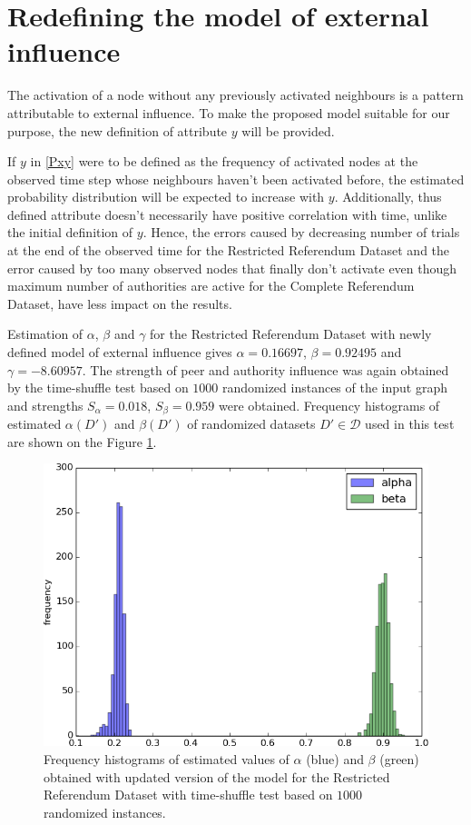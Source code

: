 \documentclass[times, utf8, zavrsni]{fer}
\begin{document}
\section{Redefining the model of external influence}

The activation of a node without any previously activated neighbours is a pattern attributable  to external influence. To make the proposed model suitable for our purpose, the new definition of attribute  $y$ will be provided.

If $y$ in \eqref{Pxy} were to be defined as the frequency of activated nodes at the observed time step whose neighbours haven't been activated before, the estimated probability distribution will be  expected to increase with $y$. Additionally, thus defined attribute doesn't necessarily have positive correlation with time, unlike the initial definition of $y$. Hence, the errors caused by decreasing number of trials at the end of the observed time for the Restricted Referendum Dataset and the error caused by too many observed nodes that finally don't activate even though maximum number of authorities are active for the Complete Referendum Dataset, have less impact on the results.

Estimation of $\alpha$, $\beta$ and $\gamma$  for the Restricted Referendum Dataset with newly defined model of external influence gives $\alpha = 0.16697$, $\beta = 0.92495$ and $\gamma = -8.60957$. The strength of peer and authority influence was again obtained by the time-shuffle test based on $1000$ randomized instances of the input graph and strengths $S_{\alpha} = 0.018$, $S_{\beta} = 0.959$ were obtained. Frequency histograms of estimated $\alpha(D')$ and $\beta(D')$ of randomized datasets $D' \in \mathcal{D}$ used in this test are shown on the Figure  \ref{hist_full2}. 
\begin{figure}[htp]
\centering
\includegraphics[scale=0.7]{abg1000_2.png}	
\caption{Frequency histograms of estimated values of $\alpha$ (blue) and $\beta$ (green)  obtained with updated version of the model for the Restricted Referendum Dataset with time-shuffle test based on $1000$ randomized instances.}
\label{hist_full2}
\end{figure}
								
\end{document}
